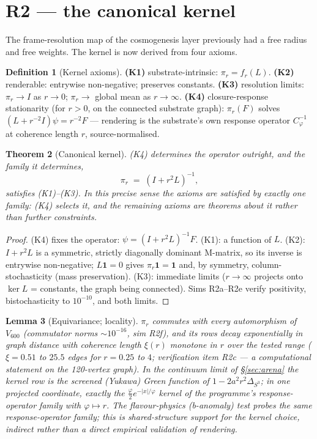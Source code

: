 \documentclass[12pt]{article}
\newtheorem{theorem}{Theorem}
\newtheorem{lemma}[theorem]{Lemma}
\theoremstyle{definition}
\newtheorem{definition}[theorem]{Definition}
\theoremstyle{remark}
\newcommand{\Vsix}{V_{600}}
\begin{document}
\section{R2 --- the canonical kernel}\label{sec:kernel}

The frame-resolution map of the cosmogenesis layer previously had a free radius and free weights. The kernel is now derived from four axioms.

\begin{definition}[Kernel axioms]\label{def:axioms}
\textbf{(K1)} substrate-intrinsic: $\pi_r = f_r(L)$. \textbf{(K2)} renderable: entrywise non-negative; preserves constants. \textbf{(K3)} resolution limits: $\pi_r \to I$ as $r\to0$; $\pi_r \to$ global mean as $r\to\infty$. \textbf{(K4)} closure-response stationarity (for $r > 0$, on the connected substrate graph): $\pi_r(F)$ solves $(L + r^{-2}I)\psi = r^{-2}F$ --- rendering is the substrate's own response operator $C_\varphi^{-1}$ at coherence length $r$, source-normalised.
\end{definition}

\begin{theorem}[Canonical kernel]\label{thm:kernel}
(K4) determines the operator outright, and the family it determines,
$$\pi_r \;=\; (I + r^2 L)^{-1},$$
satisfies (K1)--(K3). In this precise sense the axioms are satisfied by exactly one family: (K4) selects it, and the remaining axioms are theorems about it rather than further constraints.
\end{theorem}

\begin{proof}
(K4) fixes the operator: $\psi = (I + r^2L)^{-1}F$. (K1): a function of $L$. (K2): $I + r^2L$ is a symmetric, strictly diagonally dominant M-matrix, so its inverse is entrywise non-negative; $L\mathbf 1 = 0$ gives $\pi_r\mathbf1 = \mathbf1$ and, by symmetry, column-stochasticity (mass preservation). (K3): immediate limits ($r\to\infty$ projects onto $\ker L$ = constants, the graph being connected). Sims R2a--R2e verify positivity, bistochasticity to $10^{-10}$, and both limits.
\end{proof}

\begin{lemma}[Equivariance; locality]\label{lem:equiv}
$\pi_r$ commutes with every automorphism of $\Vsix$ (commutator norms $\sim10^{-16}$, sim R2f), and its rows decay exponentially in graph distance with coherence length $\xi(r)$ monotone in $r$ over the tested range ($\xi = 0.51$ to $25.5$ edges for $r = 0.25$ to $4$; verification item R2c --- a computational statement on the 120-vertex graph). In the continuum limit of \S\ref{sec:arena} the kernel row is the screened (Yukawa) Green function of $1 - 2a^2r^2\Delta_{S^3}$; in one projected coordinate, exactly the $\tfrac{\varphi}{2}e^{-|x|/\varphi}$ kernel of the programme's response-operator family with $\varphi \mapsto r$. The flavour-physics (b-anomaly) test probes the same response-operator family; this is shared-structure support for the kernel choice, indirect rather than a direct empirical validation of rendering.
\end{lemma}
\end{document}
